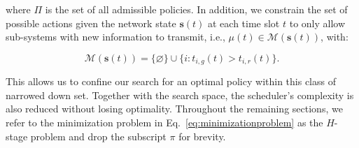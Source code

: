 where $\Pi$ is the set of all admissible policies. In addition, we constrain the
set of possible actions given the network state $\boldsymbol{s}(t)$ at each time
slot $t$ to only allow sub-systems with new information to transmit, i.e.,
$\mu(t) \in \mathcal{M}(\boldsymbol{s}(t))$, with:

\begin{equation}
  \label{eq:admissibleactions}
  \mathcal{M}(\boldsymbol{s}(t)) = \{\varnothing\} \cup \{i : t_{i,g}(t) > t_{i,r}(t) \}.
\end{equation}

This allows us to confine our search for an optimal policy within this class of
narrowed down set. Together with the search space, the scheduler's complexity is
also reduced without losing optimality. Throughout the remaining sections, we
refer to the minimization problem in Eq.~\eqref{eq:minimizationproblem} as the
$H$-stage problem and drop the subscript $\pi$ for brevity.
